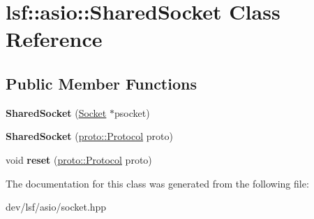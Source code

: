 \hypertarget{classlsf_1_1asio_1_1SharedSocket}{
\section{lsf::asio::SharedSocket Class Reference}
\label{classlsf_1_1asio_1_1SharedSocket}
}
\subsection*{Public Member Functions}
\begin{DoxyCompactItemize}
\item 
\hypertarget{classlsf_1_1asio_1_1SharedSocket_a7c5b1369360aa7979f9b2548f2c1c8d7}{
{\bfseries SharedSocket} (\hyperlink{classlsf_1_1asio_1_1Socket}{Socket} $\ast$psocket)}
\label{classlsf_1_1asio_1_1SharedSocket_a7c5b1369360aa7979f9b2548f2c1c8d7}

\item 
\hypertarget{classlsf_1_1asio_1_1SharedSocket_a399b1b2d390d9be9fb8299067927dfd8}{
{\bfseries SharedSocket} (\hyperlink{classlsf_1_1asio_1_1proto_1_1Protocol}{proto::Protocol} proto)}
\label{classlsf_1_1asio_1_1SharedSocket_a399b1b2d390d9be9fb8299067927dfd8}

\item 
\hypertarget{classlsf_1_1asio_1_1SharedSocket_ade652c9e0606b82f77513cb92951fc05}{
void {\bfseries reset} (\hyperlink{classlsf_1_1asio_1_1proto_1_1Protocol}{proto::Protocol} proto)}
\label{classlsf_1_1asio_1_1SharedSocket_ade652c9e0606b82f77513cb92951fc05}

\end{DoxyCompactItemize}


The documentation for this class was generated from the following file:\begin{DoxyCompactItemize}
\item 
dev/lsf/asio/socket.hpp\end{DoxyCompactItemize}
